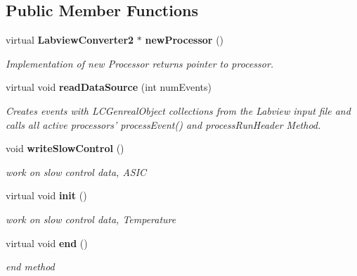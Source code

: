 \subsection*{Public Member Functions}
\begin{DoxyCompactItemize}
\item 
virtual {\bf Labview\-Converter2} $\ast$ {\bf new\-Processor} ()\label{classmarlin_1_1LabviewConverter2_a675d56e8eeba4d2ad85e8ced3884b090}

\begin{DoxyCompactList}\small\item\em Implementation of new Processor returns pointer to processor. \end{DoxyCompactList}\item 
virtual void {\bf read\-Data\-Source} (int num\-Events)\label{classmarlin_1_1LabviewConverter2_a1548f59e1de895ed0d6ca0e749dd0261}

\begin{DoxyCompactList}\small\item\em Creates events with L\-C\-Genreal\-Object collections from the Labview input file and calls all active processors' process\-Event() and process\-Run\-Header Method. \end{DoxyCompactList}\item 
void {\bf write\-Slow\-Control} ()\label{classmarlin_1_1LabviewConverter2_a55ebf8a0b8a4d3227c106937dba96a39}

\begin{DoxyCompactList}\small\item\em work on slow control data, A\-S\-I\-C \end{DoxyCompactList}\item 
virtual void {\bf init} ()
\begin{DoxyCompactList}\small\item\em work on slow control data, Temperature \end{DoxyCompactList}\item 
virtual void {\bf end} ()\label{classmarlin_1_1LabviewConverter2_a3afe7b429e0851d276e01ead2115d848}

\begin{DoxyCompactList}\small\item\em end method \end{DoxyCompactList}\end{DoxyCompactItemize}

